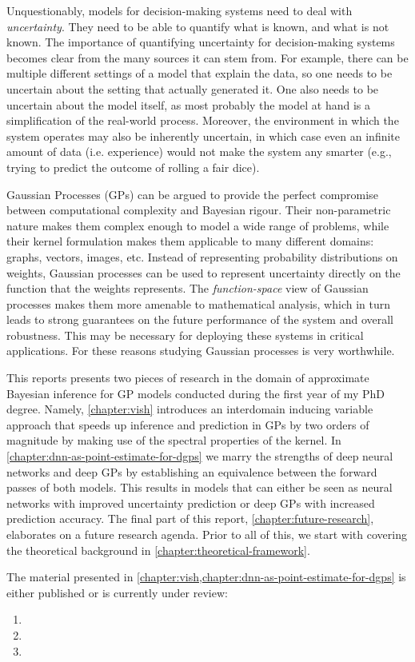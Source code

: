 Unquestionably, models for decision-making systems need to deal with \emph{uncertainty}. They need to be able to quantify what is known, and what is not known. The importance of quantifying uncertainty for decision-making systems becomes clear from the many sources it can stem from. For example, there can be multiple different settings of a model that explain the data, so one needs to be uncertain about the setting that actually generated it. One also needs to be uncertain about the model itself, as most probably the model at hand is a simplification of the real-world process. Moreover, the environment in which the system operates may also be inherently uncertain, in which case even an infinite amount of data (i.e. experience) would not make the system any smarter (e.g., trying to predict the outcome of rolling a fair dice).

Gaussian Processes (GPs) \citep{rasmussen2006} can be argued to provide the perfect compromise between computational complexity and Bayesian rigour. Their non-parametric nature makes them complex enough to model a wide range of problems, while their kernel formulation makes them applicable to many different domains: graphs, vectors, images, etc. Instead of representing probability distributions on weights, Gaussian processes can be used to represent uncertainty directly on the function that the weights represents. The \emph{function-space} view of Gaussian processes makes them more amenable to mathematical analysis, which in turn leads to strong guarantees on the future performance of the system and overall robustness. This may be necessary for deploying these systems in critical applications. For these reasons studying Gaussian processes is very worthwhile.

This reports presents two pieces of research in the domain of approximate Bayesian inference for GP models conducted during the first year of my PhD degree. Namely, \cref{chapter:vish} introduces an interdomain inducing variable approach that speeds up inference and prediction in GPs by two orders of magnitude by making use of the spectral properties of the kernel. In \cref{chapter:dnn-as-point-estimate-for-dgps} we marry the strengths of deep neural networks and deep GPs by establishing an equivalence between the forward passes of both models. This results in models that can either be seen as neural networks with improved uncertainty prediction or deep GPs with increased prediction accuracy. The final part of this report, \cref{chapter:future-research}, elaborates on a future research agenda. Prior to all of this, we start with covering the theoretical background in \cref{chapter:theoretical-framework}.

The material presented in \cref{chapter:vish,chapter:dnn-as-point-estimate-for-dgps} is either published or is currently under review:
\begin{enumerate}
    \item {}
    \item {}
    \item {}
\end{enumerate}
